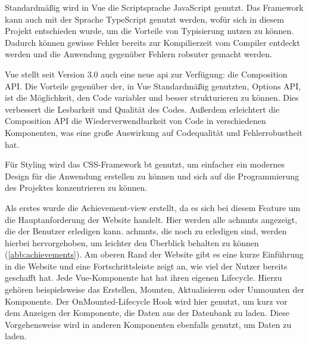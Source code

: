 \documentclass[11pt]{article}
\begin{document}
Standardmäßig wird in Vue die Scriptsprache JavaScript genutzt. Das Framework
kann auch mit der Sprache TypeScript genutzt werden, wofür sich in diesem
Projekt entschieden wurde, um die Vorteile von Typisierung nutzen zu können.
Dadurch können gewisse Fehler bereits zur Kompilierzeit vom Compiler entdeckt werden und
die Anwendung gegenüber Fehlern robsuter gemacht werden.

Vue stellt seit Version 3.0 auch eine neue \gls{api} zur Verfügung: die Composition API.
Die Vorteile gegenüber der, in Vue Standardmäßig genutzten, Options API, ist die Möglichkeit,
den Code variabler und besser strukturieren zu können. Dies verbessert die Lesbarkeit und Qualität des
Codes. Außerdem erleichtert die Composition API die Wiederverwendbarkeit
von Code in verschiedenen Komponenten, was eine große Auswirkung auf Codequalität und
Fehlerrobustheit hat.

Für Styling wird das CSS-Framework \gls{bt} genutzt, um einfacher ein modernes
Design für die Anwendung erstellen zu können und sich auf die Programmierung des
Projektes konzentrieren zu können.\newline


Als erstes wurde die Achievement-\Gls{view} erstellt, da es sich bei diesem Feature um die
Hauptanforderung der Website handelt. Hier werden alle \glspl{achmnt} angezeigt, die
der Benutzer erledigen kann. 
\Glspl{achmnt}, die noch zu erledigen sind, werden hierbei hervorgehoben, um leichter den
Überblick behalten zu können (\autoref{abb:achievements}).
Am oberen Rand der Website gibt es eine kurze Einführung in die Website und eine Fortschrittsleiste
zeigt an, wie viel der Nutzer bereits geschafft hat.
Jede Vue-Komponente hat
hat ihren eigenen Lifecycle. Hierzu gehören beispielsweise das Erstellen, Mounten,
Aktualisieren oder Unmounten der Komponente. Der OnMounted-Lifecycle Hook wird hier genutzt,
um kurz vor dem Anzeigen der Komponente, die Daten aus der Datenbank zu laden.
Diese Vorgehensweise wird in anderen Komponenten ebenfalls genutzt, um Daten zu laden. 
\end{document}
